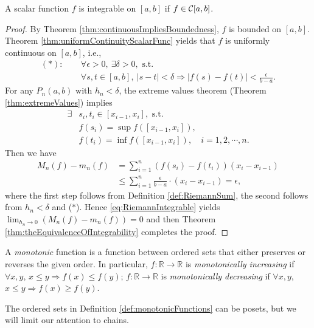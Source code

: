 \begin{thm}
  \label{thm:continuousFuncIsIntegrable}
  A scalar function $f$ is integrable on $[a, b]$
   if $f\in {\cal C}[a,b]$.
\end{thm}
\begin{proof}
  By Theorem \ref{thm:continuousImpliesBoundedness},
  $f$ is bounded on $[a,b]$.
  Theorem \ref{thm:uniformContinuityScalarFunc} yields that $f$ is
  uniformly continuous on $[a,b]$, i.e.,
  \begin{align*}
    (*):\quad
    &\ \forall \epsilon>0,\ \exists \delta>0,\text{ s.t. }\\
    &\ \forall s,t\in[a,b],\ |s-t|<\delta
      \Rightarrow |f(s)-f(t)|<\frac{\epsilon}{b-a}.
  \end{align*}
  For any $P_{n}(a,b)\text{ with }h_{n}<\delta$,
  the extreme values theorem (Theorem \ref{thm:extremeValues}) implies
  \begin{align*}
    \exists &s_{i},t_{i}\in[x_{i-1},x_{i}],\text{ s.t. }\\
            &f(s_{i})=\sup f([x_{i-1},x_{i}]),\\
            &f(t_{i})=\inf f([x_{i-1},x_{i}]),
    \quad i=1,2,\cdots,n.
  \end{align*}
  Then we have
  \begin{align*}
    M_{n}(f)-m_{n}(f)
    &=\sum_{i=1}^{n}(f(s_{i})-f(t_{i}))(x_{i}-x_{i-1})\\
    &\le \sum_{i=1}^{n}\frac{\epsilon}{b-a}\cdot (x_{i}-x_{i-1})=\epsilon,
  \end{align*}
  where the first step follows from Definition \ref{def:RiemannSum},
  the second follows from $h_{n}<\delta$ and ($*$).
  Hence \eqref{eq:RiemannIntegrable} yields
  $\lim_{h_{n}\rightarrow 0}(M_{n}(f)-m_{n}(f))=0$ and then
  Theorem \ref{thm:theEquivalenceOfIntegrability} completes the proof.
\end{proof}

\begin{defn}
  \label{def:monotonicFunctions}
  A \emph{monotonic} function is a function between ordered sets
   that either preserves or reverses the given order.
  In particular,
   $f:\mathbb{R}\rightarrow\mathbb{R}$
   is \emph{monotonically increasing}
   if $\forall x,y$, $x \le y \Rightarrow f(x)\le f(y)$;
   $f:\mathbb{R}\rightarrow\mathbb{R}$
   is \emph{monotonically decreasing}
   if $\forall x,y$, $x \le y \Rightarrow f(x)\ge f(y)$.
\end{defn}

\begin{rem}
  The ordered sets in Definition \ref{def:monotonicFunctions}
  can be posets,
  but we will limit our attention to chains.
\end{rem}

